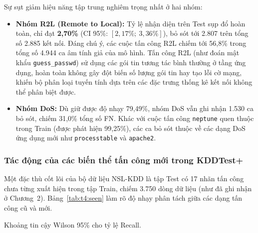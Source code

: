Sự sụt giảm hiệu năng tập trung nghiêm trọng nhất ở hai nhóm:
\begin{itemize}[leftmargin=1.2cm,itemsep=3pt]
\item \textbf{Nhóm R2L (Remote to Local):} Tỷ lệ nhận diện trên Test sụp đổ hoàn toàn, chỉ đạt \textbf{2,70\%} (CI 95\%: $[2{,}17\%;\ 3{,}36\%]$), bỏ sót tới 2.807 trên tổng số 2.885 kết nối. Đáng chú ý, các cuộc tấn công R2L chiếm tới 56,8\% trong tổng số 4.944 ca âm tính giả của mô hình. Tấn công R2L (như đoán mật khẩu \texttt{guess\_passwd}) sử dụng các gói tin tương tác bình thường ở tầng ứng dụng, hoàn toàn không gây đột biến số lượng gói tin hay tạo lỗi cờ mạng, khiến bộ phân loại tuyến tính dựa trên các đặc trưng thống kê kết nối không thể phân biệt được.
\item \textbf{Nhóm DoS:} Dù giữ được độ nhạy 79,49\%, nhóm DoS vẫn ghi nhận 1.530 ca bỏ sót, chiếm 31,0\% tổng số FN. Khác với cuộc tấn công \texttt{neptune} quen thuộc trong Train (được phát hiện 99,25\%), các ca bỏ sót thuộc về các dạng DoS ứng dụng mới như \texttt{processtable} và \texttt{apache2}.
\end{itemize}

\subsubsection{Tác động của các biến thể tấn công mới trong KDDTest+}
Một đặc thù cốt lõi của bộ dữ liệu NSL-KDD là tập Test có 17 nhãn tấn công chưa từng xuất hiện trong tập Train, chiếm 3.750 dòng dữ liệu (như đã ghi nhận ở Chương~2). Bảng~\ref{tab:t4:seen} làm rõ độ nhạy phân tách giữa các dạng tấn công cũ và mới.

\begin{table}[H]
\centering
\caption{Khả năng phát hiện các dạng tấn công đã học và tấn công mới trên KDDTest+}
\label{tab:t4:seen}
\small
\setlength{\tabcolsep}{4pt}
\par\smallskip\footnotesize Khoảng tin cậy Wilson 95\% cho tỷ lệ Recall.
\end{table}

